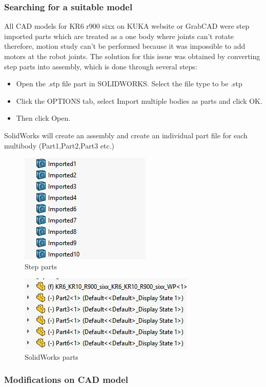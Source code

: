 \subsubsection{Searching for a suitable model}
All CAD models for KR6 r900 sixx on KUKA website or GrabCAD were step imported parts which are treated as a one body where joints can’t rotate therefore, motion study can’t be performed because it was impossible to add motors at the robot joints. The solution for this issue was obtained by converting step parts into assembly, which is done through several steps:
\begin{itemize}
	\item Open the .stp file part in SOLIDWORKS.  Select the file type to be .stp
	\item Click the OPTIONS tab, select Import multiple bodies as parts and click OK.
	\item Then click Open.
\end{itemize}
SolidWorks will create an assembly and create an individual part file for each multibody (Part1,Part2,Part3 etc.)
\begin{figure}[h]
	\centering
	\includegraphics{figures/Stepparts}
   \caption{Step parts}
\end{figure}
\begin{figure}[h]
	\centering
	\includegraphics{figures/assemblyparts}
    \caption{SolidWorks parts}
\end{figure}

\subsubsection{Modifications on CAD model}
